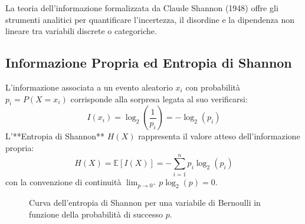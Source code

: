 La teoria dell'informazione formalizzata da Claude Shannon (1948) offre gli strumenti analitici per quantificare l'incertezza, il disordine e la dipendenza non lineare tra variabili discrete o categoriche.

\subsection{Informazione Propria ed Entropia di Shannon}
L'informazione associata a un evento aleatorio $x_i$ con probabilità $p_i = P(X = x_i)$ corrisponde alla sorpresa legata al suo verificarsi:
\begin{equation}
    I(x_i) = \log_2\left(\frac{1}{p_i}\right) = -\log_2(p_i)
\end{equation}
L'**Entropia di Shannon** $H(X)$ rappresenta il valore atteso dell'informazione propria:
\begin{equation}
    H(X) = \mathbb{E}[I(X)] = -\sum_{i=1}^n p_i \log_2(p_i)
\end{equation}
con la convenzione di continuità $\lim_{p \to 0^+} p \log_2(p) = 0$.

\begin{figure}[htbp]
\centering
{}
\caption{Curva dell'entropia di Shannon per una variabile di Bernoulli in funzione della probabilità di successo $p$.}
\label{fig:dm-bernoulli-entropy}
\end{figure}

